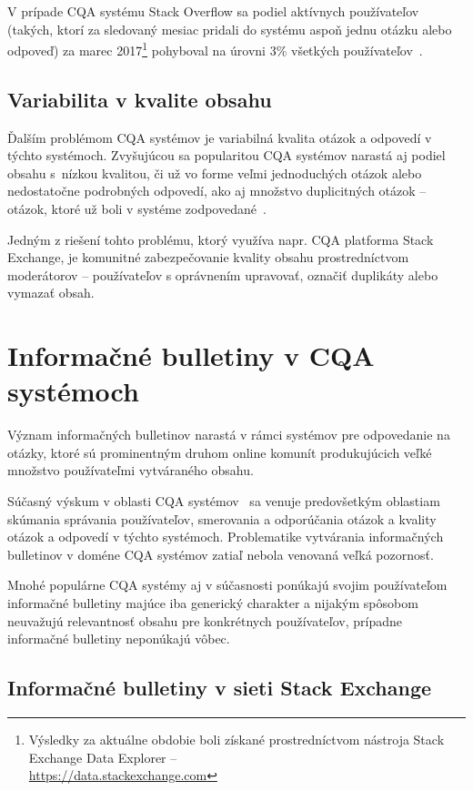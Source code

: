V prípade CQA systému Stack Overflow sa podiel aktívnych používateľov (takých, ktorí za sledovaný mesiac pridali
do systému aspoň jednu otázku alebo odpoveď) za marec 2017\footnote{Výsledky za aktuálne obdobie boli získané prostredníctvom nástroja Stack
Exchange Data Explorer -- \\\url{https://data.stackexchange.com}} pohyboval na úrovni 3\% všetkých
používateľov~\cite{Srba2016SOFail}.

\subsection{Variabilita v kvalite obsahu}
Ďalším problémom CQA systémov je variabilná kvalita otázok a odpovedí v týchto systémoch. Zvyšujúcou sa popularitou CQA
systémov narastá aj podiel obsahu s~nízkou kvalitou, či už vo forme veľmi jednoduchých otázok alebo nedostatočne
podrobných odpovedí, ako aj množstvo duplicitných otázok -- otázok, ktoré už boli v systéme
zodpovedané~\cite{Srba2016SOFail,Ponzanelli2014}.

Jedným z riešení tohto problému, ktorý využíva napr. CQA platforma Stack Exchange, je komunitné zabezpečovanie kvality obsahu
prostredníctvom moderátorov -- používateľov s oprávnením upravovať, označiť duplikáty alebo vymazať obsah.


\section{Informačné bulletiny v CQA systémoch}

Význam informačných bulletinov narastá v rámci systémov pre odpovedanie na otázky, ktoré sú prominentným druhom
online komunít produkujúcich veľké množstvo používateľmi vytváraného obsahu.

Súčasný výskum v oblasti CQA systémov~\cite{Srba2016} sa venuje predovšetkým oblastiam skúmania správania používateľov,
smerovania a odporúčania otázok a kvality otázok a odpovedí v týchto systémoch. Problematike vytvárania informačných
bulletinov v doméne CQA systémov zatiaľ nebola venovaná veľká pozornosť.

Mnohé populárne CQA systémy aj v súčasnosti ponúkajú svojim používateľom informačné bulletiny majúce iba generický
charakter a nijakým spôsobom neuvažujú relevantnosť obsahu pre konkrétnych používateľov, prípadne informačné bulletiny
neponúkajú vôbec.

\subsection{Informačné bulletiny v sieti Stack Exchange}\label{so-newsletter}

